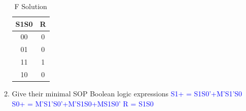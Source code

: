 \documentclass{article}
\begin{document}
\begin{enumerate}[label=(\alph*)]
\begin{enumerate}[label=(\roman*),nolistsep]
        \begin{table}[!h]
        \centering
        \begin{tabular}{|c|c|}
        \hline
        S1S0 & R\\
        \hline
        00 & 0 \\
        01 & 0 \\
        11 & 1 \\
        10 & 0 \\
        \hline
        \end{tabular}
        \caption{F Solution}
        \end {table}
            \item Give their minimal SOP Boolean logic expressions \newline\textcolor{blue}{S1+ = S1S0’+M’S1'S0\newline
S0+ = M’S1'S0'+M’S1S0+MS1S0’\newline
R = S1S0}
    
    \end{enumerate}
\end{enumerate}

\newpage
    
\end{document}
